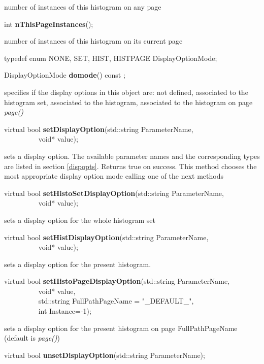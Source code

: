  number of instances of this histogram on any page


\item    int {\bf nThisPageInstances}();


 number of instances of this histogram on its current page


\item   typedef enum { NONE, SET, HIST, HISTPAGE } DisplayOptionMode;
\item    DisplayOptionMode {\bf domode}() const ;

 specifies if the display options in this object are: not defined,
 associated to the histogram set, associated to the histogram,
 associated to the histogram on  page {\it page()}


\item    virtual bool {\bf setDisplayOption}(std::string ParameterName,\\\mbox{}~~~~~~~~~ 
				void* value);

 sets a display option.  The available parameter names and the corresponding types are listed 
 in section \ref{dispopts}. Returns true on success.
 This method chooses the most appropriate display option mode calling one of the next methods  


\item    virtual bool {\bf setHistoSetDisplayOption}(std::string ParameterName,\\\mbox{}~~~~~~~~~ 
					void* value);

 sets a display option for the whole histogram set


\item    virtual bool {\bf setHistDisplayOption}(std::string ParameterName,\\\mbox{}~~~~~~~~~ 
				void* value);

 sets a display option for the present histogram.


\item    virtual bool {\bf setHistoPageDisplayOption}(std::string ParameterName,\\\mbox{}~~~~~~~~~ 
					 void* value,\\\mbox{}~~~~~~~~~
					 std::string FullPathPageName = "\_DEFAULT\_",\\\mbox{}~~~~~~~~~
					 int Instance=-1);

 sets a display option for the present histogram on page FullPathPageName (default is {\it page()})


\item    virtual bool {\bf unsetDisplayOption}(std::string ParameterName);


